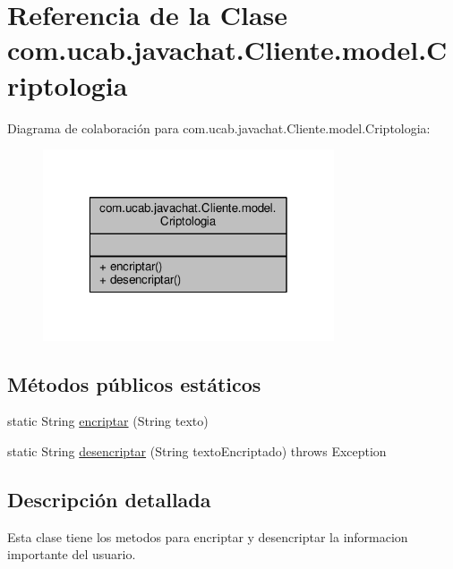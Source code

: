 \hypertarget{classcom_1_1ucab_1_1javachat_1_1_cliente_1_1model_1_1_criptologia}{\section{Referencia de la Clase com.\-ucab.\-javachat.\-Cliente.\-model.\-Criptologia}
\label{classcom_1_1ucab_1_1javachat_1_1_cliente_1_1model_1_1_criptologia}
}


Diagrama de colaboración para com.\-ucab.\-javachat.\-Cliente.\-model.\-Criptologia\-:\nopagebreak
\begin{figure}[H]
\begin{center}
\leavevmode
\includegraphics[width=244pt]{classcom_1_1ucab_1_1javachat_1_1_cliente_1_1model_1_1_criptologia__coll__graph}
\end{center}
\end{figure}
\subsection*{Métodos públicos estáticos}
\begin{DoxyCompactItemize}
\item 
static String \hyperlink{classcom_1_1ucab_1_1javachat_1_1_cliente_1_1model_1_1_criptologia_ae1dd0633e8f03d5a9ca3738ea7073275}{encriptar} (String texto)
\item 
static String \hyperlink{classcom_1_1ucab_1_1javachat_1_1_cliente_1_1model_1_1_criptologia_a00407379cf4e57988ad22d24d3e58505}{desencriptar} (String texto\-Encriptado)  throws Exception 
\end{DoxyCompactItemize}


\subsection{Descripción detallada}
Esta clase tiene los metodos para encriptar y desencriptar la informacion importante del usuario.

